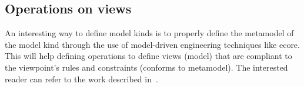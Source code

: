 %
%
%
%
%
%
%
%
%
%
%
%


\subsection{Operations on views}\label{Opns}

An interesting way to define model kinds is to properly define the metamodel of the model kind through the use of model-driven engineering techniques like ecore. This will help defining operations to define views (model) that are compliant to the viewpoint's rules and constraints (conforms to metamodel). The interested reader can refer to the work described in~\cite{MEGAF2010,MEGAF2012}.

